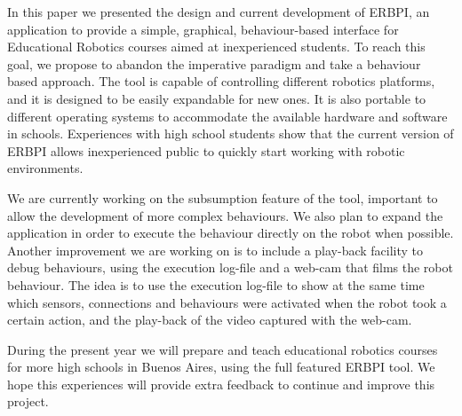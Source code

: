In this paper we presented the design and current development of ERBPI, an application to provide a simple, graphical, behaviour-based interface for Educational Robotics courses aimed at inexperienced students. To reach this goal, we propose to abandon the imperative paradigm and take a behaviour based approach. The tool is capable of controlling different robotics platforms, and it is designed to be easily expandable for new ones. It is also portable to different operating systems to accommodate the available hardware and software in schools. Experiences with high school students show that the current version of ERBPI allows inexperienced public to quickly start working with robotic environments. 

We are currently working on the subsumption feature of the tool, important to allow the development of more complex behaviours. We also plan to expand the application in order to execute the behaviour directly on the robot when possible. Another improvement we are working on is to include a play-back facility to debug behaviours, using the execution log-file and a web-cam that films the robot behaviour. The idea is to use the execution log-file to show at the same time which sensors, connections and behaviours were activated when the robot took a certain action, and the play-back of the video captured with the web-cam. 

During the present year we will prepare and teach educational robotics courses for more high schools in Buenos Aires, using the full featured ERBPI tool. We hope this experiences will provide extra feedback to continue and improve this project. 

